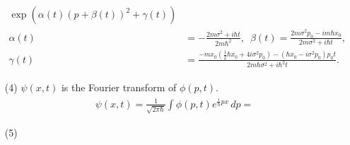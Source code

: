 \documentclass[floatfix,nofootinbib,superscriptaddress,fleqn]{revtex4}
\begin{document}
\begin{itemize}
\begin{align}
    \exp\left(
    \alpha(t)\left(p+\beta(t)\right)^2+\gamma(t)\right)  \\
    \alpha(t) &= -\frac{2m\sigma^2+i\hbar t}{2m\hbar^2}, \,\,\,
    \beta(t) = \frac{2m\sigma^2p_0-im\hbar x_0}{2m\sigma^2+i\hbar t}, \\
    \gamma(t) &= \frac{-m x_0 \left(\frac{1}{2}\hbar x_0+4i\sigma^2p_0\right)
    -(\hbar x_0-i\sigma^2 p_0)p_0 t}
    {2m\hbar\sigma^2+i\hbar^2t}.
  \end{align}
  \item[(4)] $\psi(x,t)$ is the Fourier transform of $\phi(p,t)$.
  \begin{align}
    \psi(x,t) = \frac{1}{\sqrt{2\pi\hbar}}\int\phi(p,t)e^{\frac{i}{\hbar}px}\,dp = 
  \end{align}
  \item[(5)] 
  \end{itemize}
\vspace{0.5cm}
\end{document}
